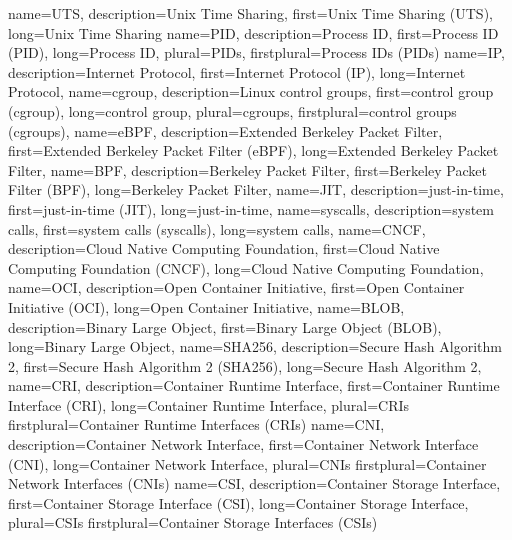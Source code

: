 {%
    name={UTS},
    description={Unix Time Sharing},
    first={Unix Time Sharing (UTS)},
    long={Unix Time Sharing}
}
{%
    name={PID},
    description={Process ID},
    first={Process ID (PID)},
    long={Process ID},
    plural={PIDs},
    firstplural={Process IDs (PIDs)}
}
{%
    name={IP},
    description={Internet Protocol},
    first={Internet Protocol (IP)},
    long={Internet Protocol},
}
{%
    name={cgroup},
    description={Linux control groups},
    first={control group (cgroup)},
    long={control group},
    plural={cgroups},
    firstplural={control groups (cgroups)},
}
{%
    name={eBPF},
    description={Extended Berkeley Packet Filter},
    first={Extended Berkeley Packet Filter (eBPF)},
    long={Extended Berkeley Packet Filter},
}
{%
    name={BPF},
    description={Berkeley Packet Filter},
    first={Berkeley Packet Filter (BPF)},
    long={Berkeley Packet Filter},
}
{%
    name={JIT},
    description={just-in-time},
    first={just-in-time (JIT)},
    long={just-in-time},
}
{%
    name={syscalls},
    description={system calls},
    first={system calls (syscalls)},
    long={system calls},
}
{%
    name={CNCF},
    description={Cloud Native Computing Foundation},
    first={Cloud Native Computing Foundation (CNCF)},
    long={Cloud Native Computing Foundation},
}
{%
    name={OCI},
    description={Open Container Initiative},
    first={Open Container Initiative (OCI)},
    long={Open Container Initiative},
}
{%
    name={BLOB},
    description={Binary Large Object},
    first={Binary Large Object (BLOB)},
    long={Binary Large Object},
}
{%
    name={SHA256},
    description={Secure Hash Algorithm 2},
    first={Secure Hash Algorithm 2 (SHA256)},
    long={Secure Hash Algorithm 2},
}
{%
    name={CRI},
    description={Container Runtime Interface},
    first={Container Runtime Interface (CRI)},
    long={Container Runtime Interface},
    plural={CRIs}
    firstplural={Container Runtime Interfaces (CRIs)}
}
{%
    name={CNI},
    description={Container Network Interface},
    first={Container Network Interface (CNI)},
    long={Container Network Interface},
    plural={CNIs}
    firstplural={Container Network Interfaces (CNIs)}
}
{%
    name={CSI},
    description={Container Storage Interface},
    first={Container Storage Interface (CSI)},
    long={Container Storage Interface},
    plural={CSIs}
    firstplural={Container Storage Interfaces (CSIs)}
}
